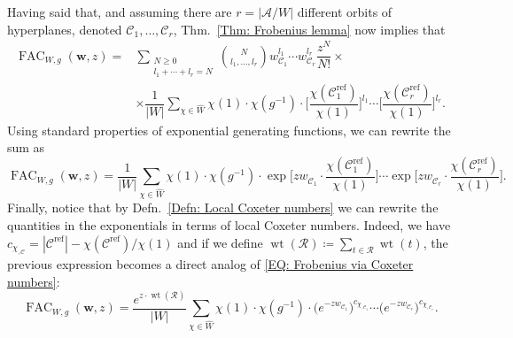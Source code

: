 \documentclass[ALCO, Unicode]{cedram}
\newcommand{\op}[1]{\operatorname{#1}}
\newcommand{\op}[1]{\operatorname{#1}}
\begin{document}
Having said that, and assuming there are $r=|\mathcal{A}/W|$ different orbits of hyperplanes, denoted $\mathcal{C}_1,\ldots, \mathcal{C}_r$, Thm.~\ref{Thm: Frobenius lemma} now implies that \begin{align*}
\op{FAC}_{W,g}(\bm w,z)=&\sum_{\substack{ N\geq 0\\l_1+\cdots +l_r=N}}\binom{N}{l_1,\ldots,l_r}w_{\mathcal{C}_1}^{l_1}\cdots w_{\mathcal{C}_r}^{l_r} \dfrac{z^N}{N!}\times\\
&\times\dfrac{1}{|W|}\sum_{\chi\in\widehat{W}}\chi(1)\cdot \chi(g^{-1})\cdot \Big[ \dfrac{\chi(\mathcal{C}^{\op{ref}}_1)}{\chi(1)}\Big]^{l_1}\cdots \Big[ \dfrac{\chi(\mathcal{C}^{\op{ref}}_r)}{\chi(1)}\Big]^{l_r}.\end{align*}Using standard properties of exponential generating functions, we can rewrite the sum as$$ 
\op{FAC}_{W,g}(\bm w,z)=\dfrac{1}{|W|}\sum_{\chi\in\widehat{W}}\chi(1)\cdot\chi(g^{-1})\cdot\op{exp}\Big[ zw_{\mathcal{C}_1}^{\phantom{l_1}}\cdot \dfrac{\chi(\mathcal{C}_1^{\op{ref}})}{\chi(1)}\Big]\cdots \op{exp}\Big[ zw_{\mathcal{C}_r}^{\phantom{l_r}}\cdot \dfrac{\chi(\mathcal{C}_r^{\op{ref}})}{\chi(1)}\Big].$$
Finally, notice that by Defn.~\ref{Defn: Local Coxeter numbers} we can rewrite the quantities in the exponentials in terms of local Coxeter numbers. Indeed, we have $c_{\chi_{,\mathcal{C}}}=|\mathcal{C}^{\op{ref}}|-\chi(\mathcal{C}^{\op{ref}})/\chi(1)$ and if we define $\op{wt}(\mathcal{R})\coloneqq \sum_{t\in\mathcal{R}}\op{wt}(t)$, the previous expression becomes a direct analog of \eqref{EQ: Frobenius via Coxeter numbers}: 
\begin{equation}
\op{FAC}_{W,g}(\bm w,z)=\dfrac{e^{z\cdot\op{wt}(\mathcal{R})}}{|W|}\sum_{\chi\in\widehat{W}}\chi(1)\cdot\chi(g^{-1})\cdot \big(e^{-zw_{\mathcal{C}_1}^{\phantom{l_1}}}\big)^{\displaystyle c_{\chi_{,\mathcal{C}_1}}}\cdots \big( e^{-zw_{\mathcal{C}_r}^{\phantom{l_r}}}\big)^{\displaystyle c_{\chi_{,\mathcal{C}_r}}}.\label{EQ: weighted enum via local Coxeter numbers}
\end{equation}
\end{document}
